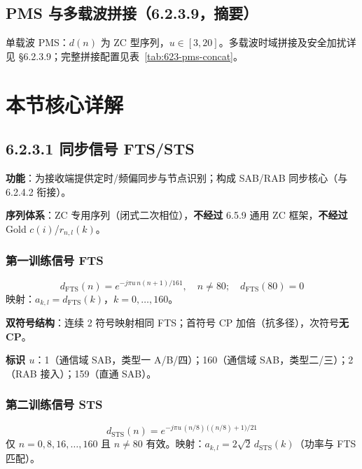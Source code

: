 \documentclass[11pt,a4paper]{ctexart}
\begin{document}
\subsection{PMS 与多载波拼接（6.2.3.9，摘要）}

单载波 PMS：$d(n)$ 为 ZC 型序列，$u{\in}[3,20]$。多载波时域拼接及安全加扰详见 \S6.2.3.9；完整拼接配置见表~\ref{tab:623-pms-concat}。

\section{本节核心详解}

\subsection{6.2.3.1 同步信号 FTS/STS}

\textbf{功能}：为接收端提供定时/频偏同步与节点识别；构成 SAB/RAB 同步核心（与 6.2.4.2 衔接）。

\textbf{序列体系}：ZC 专用序列（闭式二次相位），\textbf{不经过} 6.5.9 通用 ZC 框架，\textbf{不经过} Gold $c(i)$/$r_{n,l}(k)$。

\subsubsection{第一训练信号 FTS}

\begin{equation}
d_{\mathrm{FTS}}(n) = e^{-j\pi u\, n (n+1) / 161},\quad n{\neq}80;\quad d_{\mathrm{FTS}}(80)=0
\end{equation}
映射：$a_{k,l}=d_{\mathrm{FTS}}(k)$，$k=0,\ldots,160$。

\textbf{双符号结构}：连续 2 符号映射相同 FTS；首符号 CP 加倍（抗多径），次符号\textbf{无 CP}。

\textbf{标识 $u$}：1（通信域 SAB，类型一 A/B/四）；160（通信域 SAB，类型二/三）；2（RAB 接入）；159（直通 SAB）。

\subsubsection{第二训练信号 STS}

\begin{equation}
d_{\mathrm{STS}}(n) = e^{-j\pi u\, (n/8)\, \bigl((n/8)+1\bigr) / 21}
\end{equation}
仅 $n=0,8,16,\ldots,160$ 且 $n{\neq}80$ 有效。映射：$a_{k,l}=2\sqrt{2}\, d_{\mathrm{STS}}(k)$（功率与 FTS 匹配）。
\end{document}
